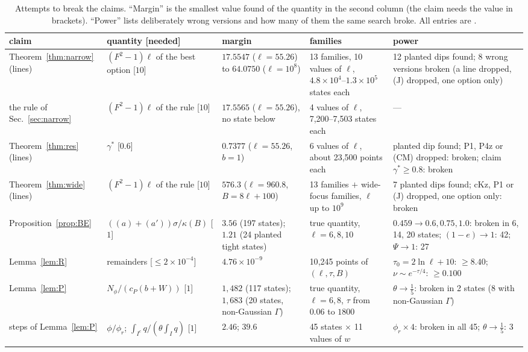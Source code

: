 \begin{table}
\caption{Attempts to break the claims. ``Margin'' is the smallest value found of the quantity in the second column (the claim needs the value in brackets). ``Power'' lists deliberately wrong versions and how many of them the same search broke. All entries are \numst.}
\label{tab:break}
\begin{ruledtabular}
\small
\begin{tabular}{p{}p{}p{}p{}p{}}
claim & quantity [needed] & margin & families & power\\ \hline
Theorem~\ref{thm:narrow} (lines) & $(F^2-1)\ell$ of the best option [$10$] & $17.5547$ ($\ell=55.26$) to $64.0750$ ($\ell=10^8$) & 13 families, 10 values of $\ell$, $4.8\times10^4$--$1.3\times10^5$ states each & 12 planted dips found; 8 wrong versions broken (a line dropped, (J) dropped, one option only)\\
the rule of Sec.~\ref{sec:narrow} & $(F^2-1)\ell$ of the rule [$10$] & $17.5565$ ($\ell=55.26$), no state below & 4 values of $\ell$, 7{,}200--7{,}503 states each & ---\\
Theorem~\ref{thm:res} (lines) & $\gamma^*$ [$0.6$] & $0.7377$ ($\ell=55.26$, $b=1$) & 6 values of $\ell$, about 23{,}500 points each & planted dip found; P1, P4z or (CM) dropped: broken; claim $\gamma^*\ge0.8$: broken\\
Theorem~\ref{thm:wide} (lines) & $(F^2-1)\ell$ of the rule [$10$] & $576.3$ ($\ell=960.8$, $B=8\ell+100$) & 13 families $+$ wide-focus families, $\ell$ up to $10^9$ & 7 planted dips found; cKz, P1 or (J) dropped, one option only: broken\\
Proposition~\ref{prop:BE} & $((a)+(a'))\sigma/\kappa(B)$ [$1$] & $3.56$ (197 states); $1.21$ (24 planted tight states) & true quantity, $\ell=6,8,10$ & $0.459\to0.6,0.75,1.0$: broken in 6, 14, 20 states; $(1-e)\to1$: 42; $\Psi\to1$: 27\\
Lemma~\ref{lem:R} & remainders [$\le2\times10^{-4}$] & $4.76\times10^{-9}$ & 10{,}245 points of $(\ell,\tau,B)$ & $\tau_0=2\ln\ell+10$: $\ge8.40$; $\nu\sim e^{-\tau/4}$: $\ge0.100$\\
Lemma~\ref{lem:P} & $N_\phi/(c_P(b+W))$ [$1$] & $1{,}482$ (117 states); $1{,}683$ (20 states, non-Gaussian $\Gamma$) & true quantity, $\ell=6,8$, $\tau$ from $0.06$ to $1800$ & $\theta\to\frac15$: broken in 2 states (8 with non-Gaussian $\Gamma$)\\
steps of Lemma~\ref{lem:P} & $\phi/\phi_r$; $\int_{I^c}q/(\theta\int_Iq)$ [$1$] & $2.46$; $39.6$ & 45 states $\times$ 11 values of $w$ & $\phi_r\times4$: broken in all 45; $\theta\to\frac15$: 3\\
\end{tabular}
\end{ruledtabular}
\end{table}

